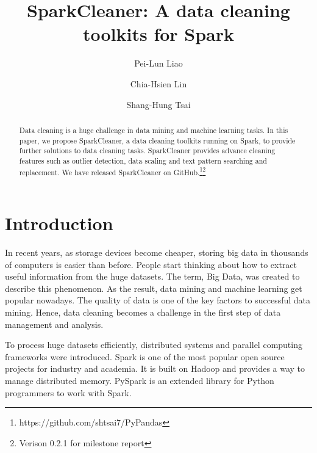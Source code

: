 \documentclass[sigconf]{acmart}
\begin{document}
\title{SparkCleaner: A data cleaning toolkits for Spark}

\author{Pei-Lun Liao}

\author{Chia-Hsien Lin}

\author{Shang-Hung Tsai}

\begin{abstract}
Data cleaning is a huge challenge in data mining and machine learning tasks. In this paper, we propose SparkCleaner, a data cleaning toolkits running on Spark, to provide further solutions to data cleaning tasks. SparkCleaner provides advance cleaning features such as outlier detection, data scaling and text pattern searching and replacement. We have released SparkCleaner on GitHub.\footnote{https://github.com/shtsai7/PyPandas}\footnote{Verison 0.2.1 for milestone report}
\end{abstract}

\maketitle

\section{Introduction}
In recent years, as storage devices become cheaper, storing big data in thousands of computers is easier than before. People start thinking about how to extract useful information from the huge datasets. The term, Big Data, was created to describe this phenomenon\cite{bigdata}. As the result, data mining\cite{Han, MMD} and machine learning\cite{ml} get popular nowadays. The quality of data is one of the key factors to successful data mining\cite{dataquality}. Hence, data cleaning becomes a challenge in the first step of data management and analysis\cite{datacleaning, DBS-045, PW}.
	
To process huge datasets efficiently, distributed systems and parallel computing frameworks\cite{mapreduce, gfs, hadoop} were introduced. Spark\cite{spark} is one of the most popular open source projects for industry and academia. It is built on Hadoop\cite{hadoop} and provides a way to manage distributed memory. PySpark\cite{pyspark} is an extended library for Python programmers to work with Spark.
	
\end{document}

